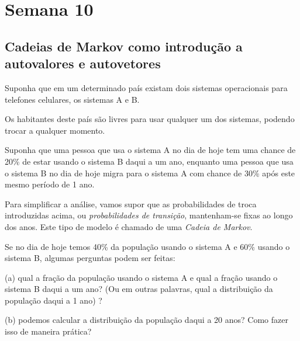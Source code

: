 

\providecommand{\dir}{..}


%

\chapter{Semana 10}


\section{Cadeias de Markov como introdução a autovalores e autovetores}

Suponha que em um determinado país existam dois sistemas operacionais para telefones celulares, os sistemas A e B.

Os habitantes deste país são livres para usar qualquer um dos sistemas, podendo trocar a qualquer momento.

Suponha que uma pessoa que usa o sistema A no dia de hoje tem uma chance de  20\% de estar usando  o sistema B daqui a um ano, enquanto uma pessoa que usa o sistema B no dia de hoje migra para o sistema A com chance de 30\% após este mesmo período de 1 ano.

Para simplificar a análise, vamos supor que as probabilidades de troca introduzidas acima, ou  {\it probabilidades de transição}, mantenham-se fixas ao longo dos anos.
Este tipo de modelo é chamado de uma {\it Cadeia de Markov}.

Se no dia de hoje temos 40\% da população usando o sistema A e 60\% usando o sistema B, algumas perguntas podem ser feitas:

\medskip


(a) qual a fração da população usando o sistema A e qual a fração usando o sistema B daqui a um ano? (Ou em outras palavras, qual a distribuição da população daqui a 1 ano) ?

(b) podemos calcular a distribuição da população daqui a 20 anos? Como fazer isso de maneira prática?

